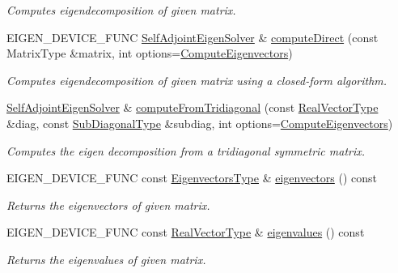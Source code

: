 \begin{DoxyCompactItemize}
\begin{DoxyCompactList}\small\item\em Computes eigendecomposition of given matrix. \end{DoxyCompactList}\item 
E\+I\+G\+E\+N\+\_\+\+D\+E\+V\+I\+C\+E\+\_\+\+F\+U\+NC \hyperlink{group___eigenvalues___module_class_eigen_1_1_self_adjoint_eigen_solver}{Self\+Adjoint\+Eigen\+Solver} \& \hyperlink{group___eigenvalues___module_a40b0a68841d6176b1ab98743cc82bef4}{compute\+Direct} (const Matrix\+Type \&matrix, int options=\hyperlink{group__enums_ggae3e239fb70022eb8747994cf5d68b4a9ada93d8885bde32b876ba4af01d3292cc}{Compute\+Eigenvectors})
\begin{DoxyCompactList}\small\item\em Computes eigendecomposition of given matrix using a closed-\/form algorithm. \end{DoxyCompactList}\item 
\hyperlink{group___eigenvalues___module_class_eigen_1_1_self_adjoint_eigen_solver}{Self\+Adjoint\+Eigen\+Solver} \& \hyperlink{group___eigenvalues___module_a297893df7098c43278d385e4d4e23fe4}{compute\+From\+Tridiagonal} (const \hyperlink{group___eigenvalues___module_acd090d5fdfc3cc017a13b6d8daa92287}{Real\+Vector\+Type} \&diag, const \hyperlink{group___core___module_class_eigen_1_1_matrix}{Sub\+Diagonal\+Type} \&subdiag, int options=\hyperlink{group__enums_ggae3e239fb70022eb8747994cf5d68b4a9ada93d8885bde32b876ba4af01d3292cc}{Compute\+Eigenvectors})
\begin{DoxyCompactList}\small\item\em Computes the eigen decomposition from a tridiagonal symmetric matrix. \end{DoxyCompactList}\item 
E\+I\+G\+E\+N\+\_\+\+D\+E\+V\+I\+C\+E\+\_\+\+F\+U\+NC const \hyperlink{group___core___module}{Eigenvectors\+Type} \& \hyperlink{group___eigenvalues___module_a7b9f7e641fa46ac4c5f2371405c69b2b}{eigenvectors} () const
\begin{DoxyCompactList}\small\item\em Returns the eigenvectors of given matrix. \end{DoxyCompactList}\item 
E\+I\+G\+E\+N\+\_\+\+D\+E\+V\+I\+C\+E\+\_\+\+F\+U\+NC const \hyperlink{group___eigenvalues___module_acd090d5fdfc3cc017a13b6d8daa92287}{Real\+Vector\+Type} \& \hyperlink{group___eigenvalues___module_a8efab27e82aa6aa0ae0c64739238c2e0}{eigenvalues} () const
\begin{DoxyCompactList}\small\item\em Returns the eigenvalues of given matrix. \end{DoxyCompactList}\item 

\end{DoxyCompactItemize}
